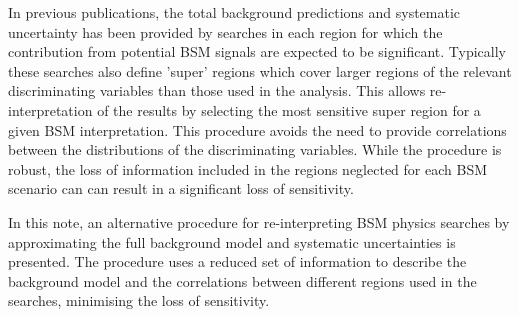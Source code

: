 In previous publications, the total background predictions  
and systematic uncertainty has been provided by searches in each region for which the contribution 
from potential BSM signals are expected to be significant. 
Typically these searches also define 'super' regions which cover larger regions of the relevant discriminating variables 
than those used in the analysis. This allows re-interpretation of the results by selecting the most sensitive 
super region for a given BSM interpretation. This procedure avoids the need to provide correlations between the 
distributions of the discriminating variables. While the procedure is robust, the loss of information included in the regions 
neglected for each BSM scenario can can result in a significant loss of sensitivity. 

In this note, an alternative procedure for re-interpreting BSM physics searches by approximating
the full background model and systematic uncertainties is presented. The procedure uses a reduced 
set of information to describe the background model 
and the correlations between different regions used in the searches, minimising the loss of sensitivity.



